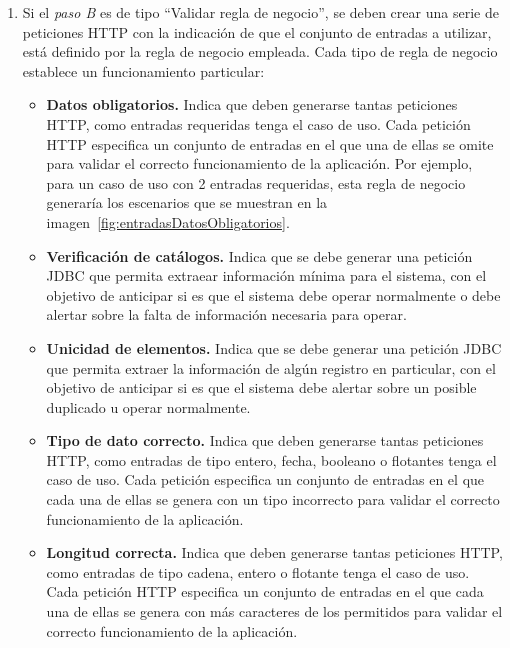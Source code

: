 \begin{enumerate}
		\begin{enumerate}
			\item Si el {\it paso B} es de tipo ``Validar regla de negocio'', se deben crear una serie de peticiones HTTP con la indicación de que el conjunto de entradas a utilizar, está definido por la regla de negocio empleada. Cada tipo de regla de negocio establece un funcionamiento particular:
	 		\begin{itemize}
	 			\item {\bf Datos obligatorios.} Indica que deben generarse tantas peticiones HTTP, como entradas requeridas tenga el caso de uso. Cada petición HTTP especifica un conjunto de entradas en el que una de ellas se omite para validar el correcto funcionamiento de la aplicación. Por ejemplo, para un caso de uso con 2 entradas requeridas, esta regla de negocio generaría los escenarios que se muestran en la imagen~\ref{fig:entradasDatosObligatorios}.\\
	 			\item {\bf Verificación de catálogos.} Indica que se debe generar una petición JDBC que permita extraear información mínima para el sistema, con el objetivo de anticipar si es que el sistema debe operar normalmente o debe alertar sobre la falta de información necesaria para operar.\\
	 			\item {\bf Unicidad de elementos.} Indica que se debe generar una petición JDBC que permita extraer la información de algún registro en particular, con el objetivo de anticipar si es que el sistema debe alertar sobre un posible duplicado u operar normalmente.\\
				\item {\bf Tipo de dato correcto.} Indica que deben generarse tantas peticiones HTTP, como entradas de tipo entero, fecha, booleano o flotantes tenga el caso de uso. Cada petición especifica un conjunto de entradas en el que cada una de ellas se genera con un tipo incorrecto para validar el correcto funcionamiento de la aplicación.\\
				\item {\bf Longitud correcta.} Indica que deben generarse tantas peticiones HTTP, como entradas de tipo cadena, entero o flotante tenga el caso de uso. Cada petición HTTP especifica un conjunto de entradas en el que cada una de ellas se genera con más caracteres de los permitidos para validar el correcto funcionamiento de la aplicación.\\
	 		\end{itemize}
			

\end{enumerate}
\end{enumerate}
